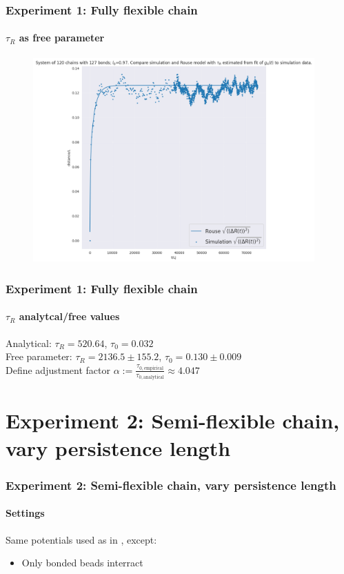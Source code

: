 \documentclass[handout]{beamer}
\begin{document}
\begin{frame}
    \frametitle{Experiment 1: Fully flexible chain}
    \framesubtitle{$\tau_R$ as free parameter}

    \begin{figure}[h]
        \includegraphics[width=10.8cm]{./3-exp-free-param.png}
    \end{figure}
\end{frame}


\begin{frame}
    \frametitle{Experiment 1: Fully flexible chain}
    \framesubtitle{$\tau_R$ analytcal/free values}

    Analytical: $\tau_R=520.64$, $\tau_0=0.032$
    \\
    Free parameter: $\tau_R=2136.5 \pm 155.2$, $\tau_0=0.130 \pm 0.009$
    \\
    \vspace{1cm}
    Define adjustment factor
    $ \alpha := \frac{\tau_{0, \textrm{empirical}}}{\tau_{0, \textrm{analytical}}} \approx 4.047$
\end{frame}

\section{Experiment 2: Semi-flexible chain, vary persistence length}

\begin{frame}
    \frametitle{Experiment 2: Semi-flexible chain, vary persistence length}
    \framesubtitle{Settings}
    Same potentials used as in \cite[Section 2.1]{svaneborg_2020}, except:
    \begin{itemize}
        \item Only bonded beads interract
    \end{itemize}
\end{frame}
\end{document}

